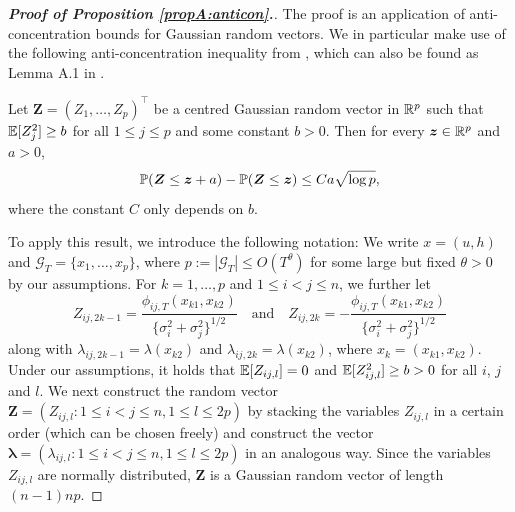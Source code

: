\documentclass[12pt]{article}
\begin{document}
\begin{proof}[\textnormal{\textbf{Proof of Proposition \ref{propA:anticon}.}}] 
The proof is an application of anti-concentration bounds for Gaussian random vectors. We in particular make use of the following anti-concentra\-tion inequality from \cite{Nazarov2003}, which can also be found as Lemma A.1 in \cite{Chernozhukov2017}. 
\begin{lemmaA}\label{lemma-Nazarov}
Let $\boldsymbol{Z} = (Z_1,\ldots,Z_p)^\top$ be a centred Gaussian random vector in $\mathbb{R}^p$ such that $\mathbb{E}[Z_j^2] \ge b$ for all $1 \le j \le p$ and some constant $b > 0$. Then for every $\boldsymbol{z} \in \mathbb{R}^p$ and $a > 0$,
\[ \mathbb{P}(\boldsymbol{Z} \le \boldsymbol{z} + a) - \mathbb{P}(\boldsymbol{Z} \le \boldsymbol{z}) \le C a \sqrt{\log p}, \]  
where the constant $C$ only depends on $b$. 
\end{lemmaA}
To apply this result, we introduce the following notation: We write $x = (u,h)$ and $\mathcal{G}_T = \{x_1,\ldots,x_p\}$, where $p := |\mathcal{G}_T| \le O(T^\theta)$ for some large but fixed $\theta > 0$ by our assumptions. For $k = 1,\ldots,p$ and $1 \le i < j \le n$, we further let 
\[ Z_{ij, 2k-1} = \frac{\phi_{ij, T}(x_{k1},x_{k2})}{\{{\sigma}_i^2 + {\sigma}_j^2\}^{1/2}} \quad \text{and} \quad Z_{ij, 2k} = -\frac{\phi_{ij, T}(x_{k1},x_{k2})}{\{{\sigma}_i^2 + {\sigma}_j^2\}^{1/2}} \]  
along with $\lambda_{ij,2k-1} = \lambda(x_{k2})$ and $\lambda_{ij,2k} = \lambda(x_{k2})$, where $x_k = (x_{k1},x_{k2})$. Under our assumptions, it holds that $\mathbb{E}[Z_{ij,l}] = 0$ and $\mathbb{E}[Z_{ij,l}^2] \ge b > 0$ for all $i$, $j$ and $l$. We next construct the random vector $\boldsymbol{Z} = ( Z_{ij,l} : 1 \le i < j \le n, 1 \le l \le 2p)$ by stacking the variables $Z_{ij, l}$ in a certain order (which can be chosen freely) and construct the vector $\boldsymbol{\lambda} = (\lambda_{ij,l}: 1 \le i < j \le n, 1 \le l \le 2p)$ in an analogous way. Since the variables $Z_{ij,l}$ are normally distributed, $\boldsymbol{Z}$ is a Gaussian random vector of length $(n-1)np$. 



\end{proof}
\end{document}

